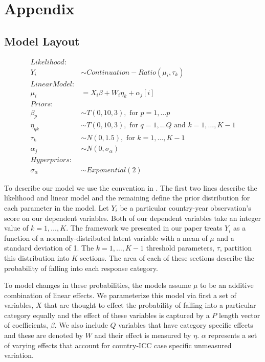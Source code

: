 \renewcommand{\thefigure}{A\arabic{figure}}
\setcounter{figure}{0}
\renewcommand{\thetable}{A.\arabic{table}}
\setcounter{table}{0}
\renewcommand{\thesection}{A.\arabic{section}}
\setcounter{section}{0}

\section*{Appendix}

\subsection*{Model Layout}

\begin{align*}
  Likelihood:& \\
  Y_{i} &\sim Continuation-Ratio(\mu_{i}, \tau_{k}) \\
  Linear Model:& \\
  \mu_{i} &= X_{i} \beta + W_{i}\eta_{k} + \alpha_{j}[i] \\
  Priors:& \\
  \beta_{p} &\sim T(0, 10, 3), \text{ for } p = 1, \ldots p \\
  \eta_{qk} &\sim T(0, 10, 3), \text{ for } q = 1, \ldots Q \text{ and } k =1, \ldots, K-1 \\
  \tau_{k} &\sim N(0, 1.5), \text{ for } k = 1, \ldots, K-1 \\
  \alpha_{j} &\sim N(0, \sigma_{\alpha}) \\
  Hyperpriors:& \\
  \sigma_{\alpha} &\sim Exponential(2)
\end{align*}

To describe our model we use the convention in \citet{mcelreath2016statistical}. The first two lines describe the likelihood and linear model and the remaining define the prior distribution for each parameter in the model. Let $Y_{i}$ be a particular country-year observation's score on our dependent variables. Both of our dependent variables take an integer value of $k=1, \ldots, K$. The framework we presented in our paper treats $Y_{i}$ as a function of a normally-distributed latent variable with a mean of $\mu$ and a standard deviation of 1. The $k=1, \ldots, K-1$ threshold parameters, $\tau$, partition this distribution into $K$ sections. The area of each of these sections describe the probability of falling into each response category.

To model changes in these probabilities, the models assume $\mu$ to be an additive combination of linear effects. We parameterize this model via first a set of variables, $X$ that are thought to effect the probability of falling into a particular category equally and the effect of these variables is captured by a $P$ length vector of coefficients, $\beta$. We also include $Q$ variables that have category specific effects and these are denoted by $W$ and their effect is measured by $\eta$. $\alpha$ represents a set of varying effects that account for country-ICC case specific unmeasured variation.

